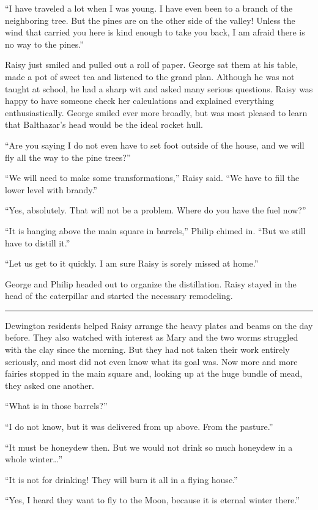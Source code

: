 \documentclass[10pt, draft]{memoir}
\renewcommand{\pfbreakdisplay}{\bigskip \ding{166} \bigskip}
\newcommand{\secbreak}{\fancybreak{\pfbreakdisplay}}
\begin{document}
``I have traveled a lot when I was young. I have even been to a branch of the
neighboring tree. But the pines are on the other side of the valley! Unless the
wind that carried you here is kind enough to take you back, I am afraid there
is no way to the pines.''

Raisy just smiled and pulled out a roll of paper. George sat them at his table,
made a pot of sweet tea and listened to the grand plan. Although he was not
taught at school, he had a sharp wit and asked many serious questions. Raisy
was happy to have someone check her calculations and explained everything
enthusiastically. George smiled ever more broadly, but was most pleased to
learn that Balthazar's head would be the ideal rocket hull.

``Are you saying I do not even have to set foot outside of the house, and we
will fly all the way to the pine trees?''

``We will need to make some transformations,'' Raisy said. ``We have to fill
the lower level with brandy.''

``Yes, absolutely. That will not be a problem. Where do you have the fuel
now?''

``It is hanging above the main square in barrels,'' Philip chimed in. ``But we
still have to distill it.''

``Let us get to it quickly. I am sure Raisy is sorely missed at home.''

George and Philip headed out to organize the distillation. Raisy stayed in the
head of the caterpillar and started the necessary remodeling.

\secbreak

Dewington residents helped Raisy arrange the heavy plates and beams on the day
before. They also watched with interest as Mary and the two worms struggled
with the clay since the morning. But they had not taken their work entirely
seriously, and most did not even know what its goal was. Now more and more
fairies stopped in the main square and, looking up at the huge bundle of mead,
they asked one another.

``What is in those barrels?''

``I do not know, but it was delivered from up above. From the pasture.''

``It must be honeydew then. But we would not drink so much honeydew in a whole
winter\dots''

``It is not for drinking! They will burn it all in a flying house.''

``Yes, I heard they want to fly to the Moon, because it is eternal winter
there.''
\end{document}
